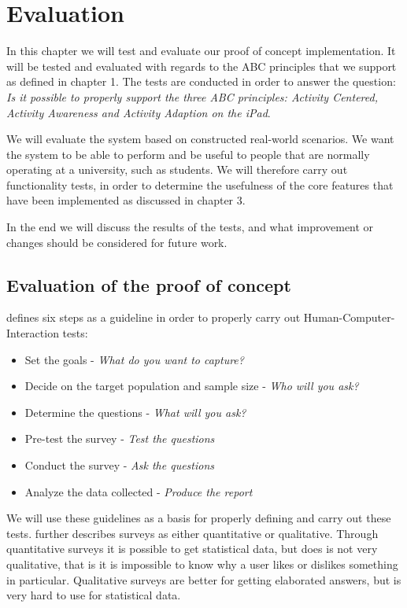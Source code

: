 \chapter{Evaluation}
\label{sec:evaluation}
In this chapter we will test and evaluate our proof of concept implementation. It will be tested and evaluated with regards to the ABC principles that we support as defined in chapter 1. The tests are conducted in order to answer the question: \emph{Is it possible to properly support the three ABC principles: Activity Centered, Activity Awareness and Activity Adaption on the iPad}.

We will evaluate the system based on constructed real-world scenarios. We want the system to be able to perform and be useful to people that are normally operating at a university, such as students. We will therefore carry out functionality tests, in order to determine the usefulness of the core features that have been implemented as discussed in chapter 3.

In the end we will discuss the results of the tests, and what improvement or changes should be considered for future work.

\section{Evaluation of the proof of concept}
\label{sec:evalutationPOC}

\citet{ugur2001} defines six steps as a guideline in order to properly carry out Human-Computer-Interaction tests:

\begin{itemize}
  \item Set the goals - \emph{What do you want to capture?}
  \item Decide on the target population and sample size - \emph{Who will you ask?}
  \item Determine the questions - \emph{What will you ask?}
  \item Pre-test the survey - \emph{Test the questions}
  \item Conduct the survey - \emph{Ask the questions}
  \item Analyze the data collected - \emph{Produce the report}
\end{itemize}

We will use these guidelines as a basis for properly defining and carry out these tests. \citet{ugur2001} further describes surveys as either quantitative or qualitative. Through quantitative surveys it is possible to get statistical data, but does is not very qualitative, that is it is impossible to know why a user likes or dislikes something in particular. Qualitative surveys are better for getting elaborated answers, but is very hard to use for statistical data.

